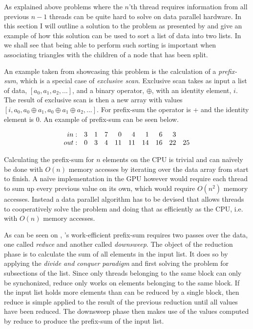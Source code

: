 
As explained above problems where the $n$’th thread requires information from
all previous $n-1$ threads can be quite hard to solve on data parallel
hardware. In this section I will outline a solution to the problem as presented
by \sengupta{} and give an example of how this solution can be used to sort a
list of data into two lists. In  we shall see that
being able to perform such sorting is important when associating triangles with
the children of a node that has been split.


An example taken from \sengupta{} showcasing this problem is the calculation of
a \textit{prefix-sum}, which is a special case of \textit{exclusive
  scan}. Exclusive scan takes as input a list of data, $[a_0, a_1, a_2, ...]$,
and a binary operator, $\oplus$, with an identity element, $i$. The result of
exclusive scan is then a new array with values $[i, a_0, a_0 \oplus a_1, a_0
  \oplus a_1 \oplus a_2, ...]$. For prefix-sum the operator is + and the
identity element is 0. An example of prefix-sum can be seen below.

\begin{displaymath}
  \begin{array}{r r r r r r r r r r}
    in: & 3 & 1 & 7 & 0 & 4 & 1 & 6 & 3 \\
    out: & 0 & 3 & 4 & 11 & 11 & 14 & 16 & 22 & 25 \\
  \end{array}
\end{displaymath}

Calculating the prefix-sum for $n$ elements on the CPU is trivial and can
naïvely be done with $O(n)$ memory accesses by iterating over the data array
from start to finish. A naïve implementation in the GPU however would require
each thread to sum up every previous value on its own, which would require
$O(n^2)$ memory accesses. Instead a data parallel algorithm has to be devised
that allows threads to cooperatively solve the problem and doing that as
efficiently as the CPU, i.e. with $O(n)$ memory accesses.




As can be seen on , \sengupta{}'s work-efficient prefix-sum
requires two passes over the data, one called \textit{reduce} and another called
\textit{downsweep}. The object of the reduction phase is to calculate the sum of
all elements in the input list. It does so by applying the \textit{divide and
  conquer paradigm} and first solving the problem for subsections of the
list. Since only threads belonging to the same block can only be synchonized,
reduce only works on elements belonging to the same block. If the input list
holds more elements than can be reduced by a single block, then reduce is simple
applied to the result of the previous reduction until all values have been
reduced. The downsweep phase then makes use of the values computed by reduce to
produce the prefix-sum of the input list.

